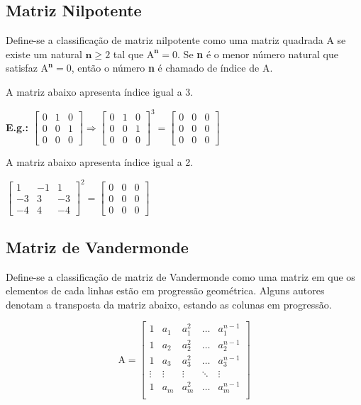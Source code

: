 \documentclass[a4paper,12pt]{article}
\begin{document}
\subsection{Matriz Nilpotente}
Define-se a classificação de matriz nilpotente como uma matriz quadrada $\text{A}$ se existe um natural $ \textbf{n} \geq 2 $ tal que $ \text{A}^{\textbf{n}} = 0 $. Se \textbf{n} é o menor número natural que satisfaz $ \text{A}^{\textbf{n}} = 0 $, então o número \textbf{n} é chamado de índice de $ \text{A} $.

A matriz abaixo apresenta índice igual a $ 3 $.

\textbf{E.g.:} $ \begin{bmatrix}
0 & 1 & 0\\
0 & 0 & 1\\
0 & 0 & 0 
\end{bmatrix}  \Rightarrow  \begin{bmatrix}
0 & 1 & 0\\
0 & 0 & 1\\
0 & 0 & 0 
\end{bmatrix} ^{3} =  \begin{bmatrix}
0 & 0 & 0\\
0 & 0 & 0\\
0 & 0 & 0 
\end{bmatrix} $

A matriz abaixo apresenta índice igual a 2.

$ \begin{bmatrix}
1 & -1 & 1\\
-3 & 3 & -3\\
-4 & 4 & -4
\end{bmatrix}^{2} = \begin{bmatrix}
 0 & 0 & 0\\
 0 & 0 & 0\\
 0 & 0 & 0
\end{bmatrix}$

\subsection{Matriz de Vandermonde}

Define-se a classificação de matriz de Vandermonde como uma matriz em que os elementos de cada linhas estão em progressão geométrica. Alguns autores denotam a transposta da matriz abaixo, estando as colunas em progressão.

$$ \text{A} = \begin{bmatrix}
1 & a_1 & a_1^2 & \dots & a_1^{n-1}\\
1 & a_2 & a_2^2 & \dots & a_2^{n-1}\\
1 & a_3 & a_3^2 & \dots & a_3^{n-1}\\
\vdots & \vdots & \vdots & \ddots &\vdots \\
1 & a_m & a_m^2 & \dots & a_m^{n-1}\\
\end{bmatrix} $$
\end{document}
